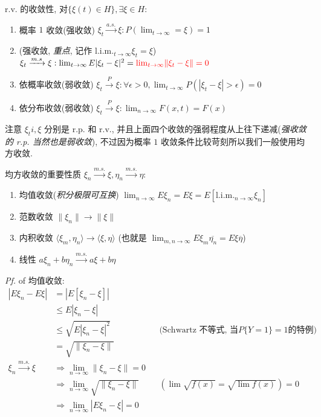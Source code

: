 
r.v. 的收敛性, 对$\{\xi(t) \in H\}, \exists \xi \in H$:
\begin{enumerate}
	\item 概率 $1$ 收敛(强收敛) $\xi_t \xrightarrow{a.s.} \xi: P(\lim_{t\to\infty} = \xi) = 1$
	\item {}(强收敛, \emph{重点}, 记作 $\text{l.i.m.}_{t\to\infty}\xi_t = \xi$) $\xi_t \xrightarrow{m.s} \xi: \lim_{t\to \infty} E|\xi_t - \xi|^2 = \textcolor{red}{\lim_{t\to\infty}\lVert\xi_t-\xi\rVert = 0}$
	\item 依概率收敛(弱收敛) $\xi_t \xrightarrow{P} \xi: \forall \epsilon > 0, \lim_{t\to \infty} P(|\xi_t - \xi| > \epsilon) = 0$
	\item 依分布收敛(弱收敛) $\xi_t \xrightarrow{P} \xi: \lim_{n\to\infty} F(x, t) = F(x)$
\end{enumerate}
注意 $\xi_ti, \xi$ 分别是 r.p. 和 r.v., 并且上面四个收敛的强弱程度从上往下递减(\emph{强收敛的 r.p. 当然也是弱收敛}), 不过因为概率 $1$ 收敛条件比较苛刻所以我们一般使用均方收敛.


均方收敛的重要性质 $\xi_n \xrightarrow{m.s.} \xi, \eta_n \xrightarrow{m.s.} \eta$:
\begin{enumerate}
	\item 均值收敛(\emph{积分极限可互换}) $\lim_{n\to\infty}E\xi_n = E\xi =  E[\text{l.i.m.}_{n\to\infty} \xi_n]$
	\item 范数收敛 $\lVert\xi_n\rVert \rightarrow \lVert\xi\rVert$
	\item 内积收敛 $\langle\xi_m,\eta_n\rangle \rightarrow \langle\xi,\eta\rangle$ (也就是 $\lim_{m,n\to\infty} E\xi_m\overline{\eta_n} = E\xi\overline{\eta}$)
	\item 线性 $a\xi_n+b\eta_n\xrightarrow{m.s.} a\xi+b\eta$
\end{enumerate}

\emph*{Pf.} of 均值收敛:
\begin{align*}
	|E\xi_n - E\xi| &= |E[\xi_n - \xi]| \\
	&\le E|\xi_n - \xi| \\
	&\le \sqrt{E|\xi_n - \xi|^2} &&\text{(Schwartz 不等式, 当}P\{Y=1\}=1\text{的特例)}\\
	&= \sqrt{\lVert \xi_n - \xi\rVert} \\
	\xi_n \xrightarrow{m.s.} \xi &\Rightarrow \lim_{n\to\infty}\lVert\xi_n-\xi\rVert  =0\\
	&\Rightarrow \lim_{n\to\infty} \sqrt{\lVert\xi_n-\xi\rVert} &&(\lim\sqrt{f(x)} = \sqrt{\lim f(x)}) = 0\\
	&\Rightarrow \lim_{n\to\infty}|E\xi_n-\xi| = 0
\end{align*}

